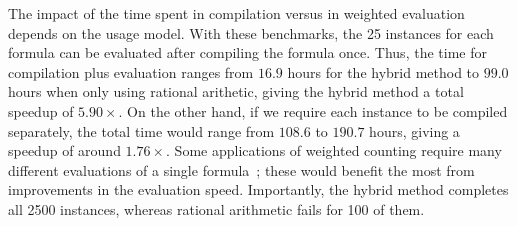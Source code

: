 \documentclass{easychair}
\begin{document}
The impact of the time spent in compilation versus in weighted
evaluation depends on the usage model.  With these benchmarks, the 25
instances for each formula can be evaluated after compiling the
formula once.  Thus, the time for compilation plus evaluation ranges
from $16.9$ hours for the hybrid method to $99.0$ hours when only
using rational arithetic, giving the hybrid method a total speedup of
$5.90\times$.  On the other hand, if we require each instance to be
compiled separately, the total time would range from $108.6$ to
$190.7$ hours, giving a speedup of around $1.76\times$.  Some
applications of weighted counting require many different evaluations
of a single formula~\cite{sundermann:tsem:2024}; these would benefit
the most from improvements in the evaluation speed. Importantly, the
hybrid method completes all 2500 instances, whereas rational
arithmetic fails for 100 of them.
\end{document}
